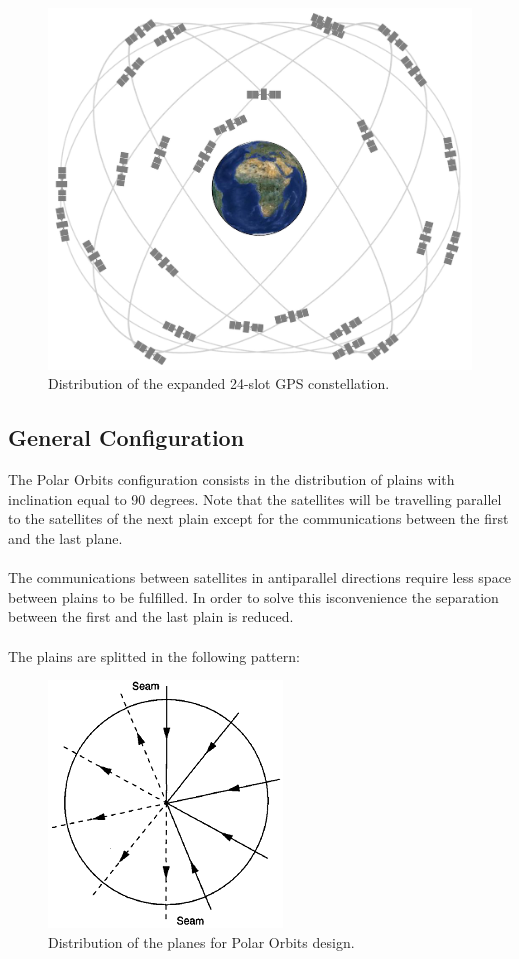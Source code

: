 \begin{figure}[H]
\begin{center}
\includegraphics[scale=0.2]{PolarOrbits/GPSconstellation.jpg}
\caption{Distribution of the expanded 24-slot GPS constellation.}
\end{center}
\end{figure}

\subsection{General Configuration}
The Polar Orbits configuration consists in the distribution of plains with inclination equal to 90 degrees. Note that the satellites will be travelling parallel to the satellites of the next plain except for the communications between the first and the last plane. 
\\
\\
The communications between satellites in antiparallel directions require less space between plains to be fulfilled. In order to solve this isconvenience the separation between the first and the last plain is reduced.
\\
\\
The plains are splitted in the following pattern:

\begin{figure}[H]
\begin{center}
\includegraphics[scale=0.7]{PolarOrbits/planeconfig.png}
\caption{Distribution of the planes for Polar Orbits design.}
\end{center}
\end{figure}

